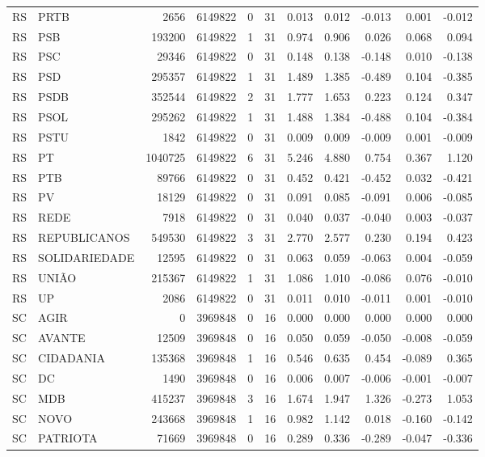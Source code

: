 \begin{landscape}
\begin{longtable}{llrrrrrrrrr}
RS & PRTB & 2656 & 6149822 & 0 & 31 & 0.013 & 0.012 & -0.013 & 0.001 & -0.012 \\
RS & PSB & 193200 & 6149822 & 1 & 31 & 0.974 & 0.906 & 0.026 & 0.068 & 0.094 \\
RS & PSC & 29346 & 6149822 & 0 & 31 & 0.148 & 0.138 & -0.148 & 0.010 & -0.138 \\
RS & PSD & 295357 & 6149822 & 1 & 31 & 1.489 & 1.385 & -0.489 & 0.104 & -0.385 \\
RS & PSDB & 352544 & 6149822 & 2 & 31 & 1.777 & 1.653 & 0.223 & 0.124 & 0.347 \\
RS & PSOL & 295262 & 6149822 & 1 & 31 & 1.488 & 1.384 & -0.488 & 0.104 & -0.384 \\
RS & PSTU & 1842 & 6149822 & 0 & 31 & 0.009 & 0.009 & -0.009 & 0.001 & -0.009 \\
RS & PT & 1040725 & 6149822 & 6 & 31 & 5.246 & 4.880 & 0.754 & 0.367 & 1.120 \\
RS & PTB & 89766 & 6149822 & 0 & 31 & 0.452 & 0.421 & -0.452 & 0.032 & -0.421 \\
RS & PV & 18129 & 6149822 & 0 & 31 & 0.091 & 0.085 & -0.091 & 0.006 & -0.085 \\
RS & REDE & 7918 & 6149822 & 0 & 31 & 0.040 & 0.037 & -0.040 & 0.003 & -0.037 \\
RS & REPUBLICANOS & 549530 & 6149822 & 3 & 31 & 2.770 & 2.577 & 0.230 & 0.194 & 0.423 \\
RS & SOLIDARIEDADE & 12595 & 6149822 & 0 & 31 & 0.063 & 0.059 & -0.063 & 0.004 & -0.059 \\
RS & UNIÃO & 215367 & 6149822 & 1 & 31 & 1.086 & 1.010 & -0.086 & 0.076 & -0.010 \\
RS & UP & 2086 & 6149822 & 0 & 31 & 0.011 & 0.010 & -0.011 & 0.001 & -0.010 \\
SC & AGIR & 0 & 3969848 & 0 & 16 & 0.000 & 0.000 & 0.000 & 0.000 & 0.000 \\
SC & AVANTE & 12509 & 3969848 & 0 & 16 & 0.050 & 0.059 & -0.050 & -0.008 & -0.059 \\
SC & CIDADANIA & 135368 & 3969848 & 1 & 16 & 0.546 & 0.635 & 0.454 & -0.089 & 0.365 \\
SC & DC & 1490 & 3969848 & 0 & 16 & 0.006 & 0.007 & -0.006 & -0.001 & -0.007 \\
SC & MDB & 415237 & 3969848 & 3 & 16 & 1.674 & 1.947 & 1.326 & -0.273 & 1.053 \\
SC & NOVO & 243668 & 3969848 & 1 & 16 & 0.982 & 1.142 & 0.018 & -0.160 & -0.142 \\
SC & PATRIOTA & 71669 & 3969848 & 0 & 16 & 0.289 & 0.336 & -0.289 & -0.047 & -0.336 \\

\end{longtable}
\end{landscape}
